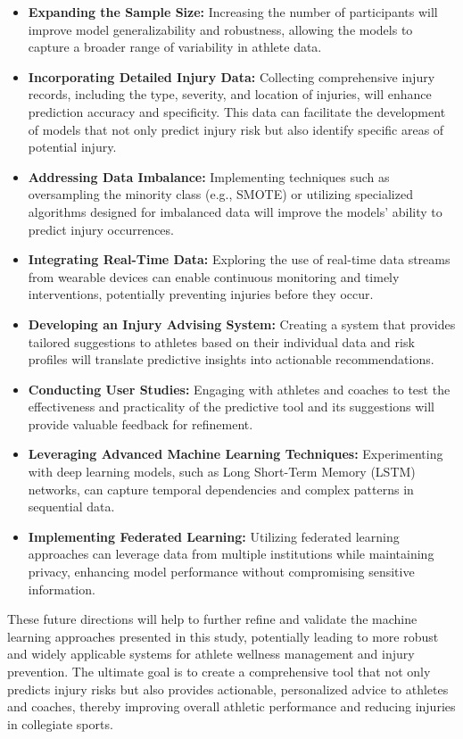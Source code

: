 \documentclass[manuscript,acmsmall,review,screen,authorversion=true]{acmart}
\begin{document}
\begin{itemize}
    \item \textbf{Expanding the Sample Size:} Increasing the number of participants will improve model generalizability and robustness, allowing the models to capture a broader range of variability in athlete data.

    \item \textbf{Incorporating Detailed Injury Data:} Collecting comprehensive injury records, including the type, severity, and location of injuries, will enhance prediction accuracy and specificity. This data can facilitate the development of models that not only predict injury risk but also identify specific areas of potential injury.

    \item \textbf{Addressing Data Imbalance:} Implementing techniques such as oversampling the minority class (e.g., SMOTE) or utilizing specialized algorithms designed for imbalanced data will improve the models' ability to predict injury occurrences.

    \item \textbf{Integrating Real-Time Data:} Exploring the use of real-time data streams from wearable devices can enable continuous monitoring and timely interventions, potentially preventing injuries before they occur.

    \item \textbf{Developing an Injury Advising System:} Creating a system that provides tailored suggestions to athletes based on their individual data and risk profiles will translate predictive insights into actionable recommendations.

    \item \textbf{Conducting User Studies:} Engaging with athletes and coaches to test the effectiveness and practicality of the predictive tool and its suggestions will provide valuable feedback for refinement.

    \item \textbf{Leveraging Advanced Machine Learning Techniques:} Experimenting with deep learning models, such as Long Short-Term Memory (LSTM) networks, can capture temporal dependencies and complex patterns in sequential data.

    \item \textbf{Implementing Federated Learning:} Utilizing federated learning approaches can leverage data from multiple institutions while maintaining privacy, enhancing model performance without compromising sensitive information.
\end{itemize}

These future directions will help to further refine and validate the machine learning approaches presented in this study, potentially leading to more robust and widely applicable systems for athlete wellness management and injury prevention. The ultimate goal is to create a comprehensive tool that not only predicts injury risks but also provides actionable, personalized advice to athletes and coaches, thereby improving overall athletic performance and reducing injuries in collegiate sports.



\end{document}
